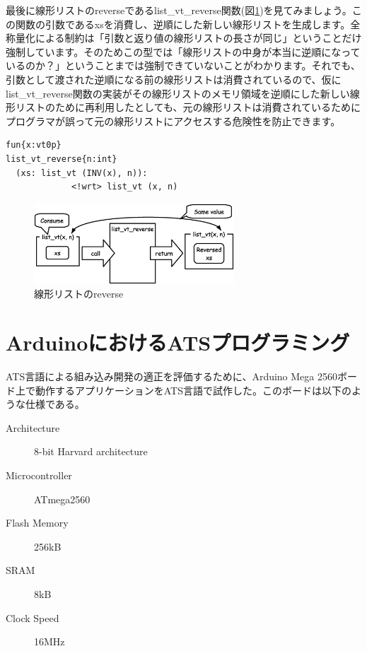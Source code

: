 \documentclass{ipsjprosym}
\begin{document}
最後に線形リストのreverseであるlist\_vt\_reverse関数(図\ref{fig:list_vt_reverse})を見てみましょう。この関数の引数であるxsを消費し、逆順にした新しい線形リストを生成します。全称量化による制約は「引数と返り値の線形リストの長さが同じ」ということだけ強制しています。そのためこの型では「線形リストの中身が本当に逆順になっているのか？」ということまでは強制できていないことがわかります。それでも、引数として渡された逆順になる前の線形リストは消費されているので、仮にlist\_vt\_reverse関数の実装がその線形リストのメモリ領域を逆順にした新しい線形リストのために再利用したとしても、元の線形リストは消費されているためにプログラマが誤って元の線形リストにアクセスする危険性を防止できます。

\vspace{3mm}
\begin{verbatim}
fun{x:vt0p}
list_vt_reverse{n:int}
  (xs: list_vt (INV(x), n)):
             <!wrt> list_vt (x, n)
\end{verbatim}
\vspace{3mm}

\begin{figure}[h]
\centering
\includegraphics[width=75mm]{draw/list_vt_reverse.eps}
\caption{線形リストのreverse}
\label{fig:list_vt_reverse}
\end{figure}

\section{ArduinoにおけるATSプログラミング}

ATS言語による組み込み開発の適正を評価するために、Arduino Mega 2560ボード上で動作するアプリケーションをATS言語で試作した。このボードは以下のような仕様である。

\begin{description}
  \item[Architecture] 8-bit Harvard architecture
  \item[Microcontroller] ATmega2560
  \item[Flash Memory] 256kB
  \item[SRAM] 8kB
  \item[Clock Speed] 16MHz
\end{description}
\end{document}

